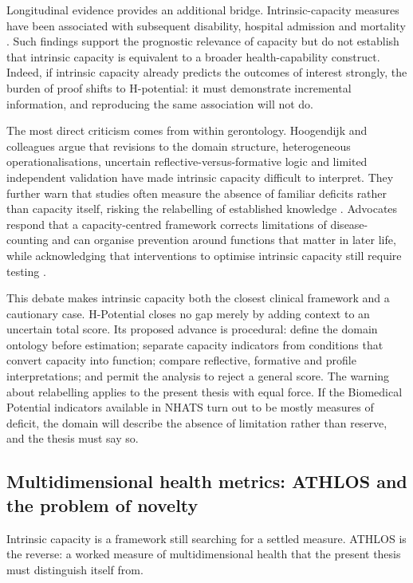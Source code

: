 Longitudinal evidence provides an additional bridge. Intrinsic-capacity measures have been associated with subsequent disability, hospital admission and mortality \citep{beard_intrinsic_2019,intrinsic_capacity_predictive_2023}. Such findings support the prognostic relevance of capacity but do not establish that intrinsic capacity is equivalent to a broader health-capability construct. Indeed, if intrinsic capacity already predicts the outcomes of interest strongly, the burden of proof shifts to H-potential: it must demonstrate incremental information, and reproducing the same association will not do.

The most direct criticism comes from within gerontology. Hoogendijk and
colleagues argue that revisions to the domain structure, heterogeneous
operationalisations, uncertain reflective-versus-formative logic and limited
independent validation have made intrinsic capacity difficult to interpret.
They further warn that studies often measure the absence of familiar deficits
rather than capacity itself, risking the relabelling of established knowledge
\citep{hoogendijk_2023}. Advocates respond that a capacity-centred framework
corrects limitations of disease-counting and can organise prevention around
functions that matter in later life, while acknowledging that interventions to
optimise intrinsic capacity still require testing \citep{geerinck_2022}.

This debate makes intrinsic capacity both the closest clinical framework and a
cautionary case. H-Potential closes no gap merely by adding context to an
uncertain total score. Its proposed advance is procedural: define the domain
ontology before estimation; separate capacity indicators from conditions that
convert capacity into function; compare reflective, formative and profile
interpretations; and permit the analysis to reject a general score. The warning
about relabelling applies to the present thesis with equal force. If the
Biomedical Potential indicators available in NHATS turn out to be mostly
measures of deficit, the domain will describe the absence of limitation rather
than reserve, and the thesis must say so.

\subsection{Multidimensional health metrics: ATHLOS and the problem of novelty}

Intrinsic capacity is a framework still searching for a settled measure. ATHLOS is the reverse: a worked measure of multidimensional health that the present thesis must distinguish itself from.

